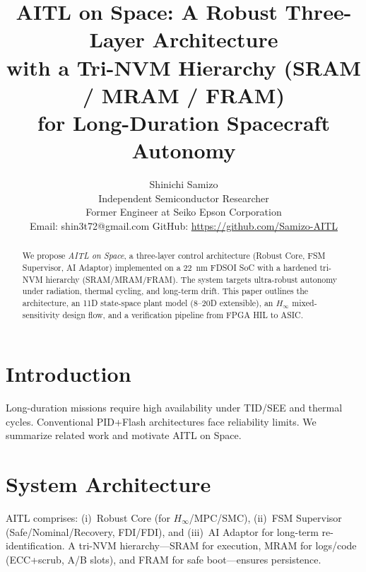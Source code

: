 \documentclass[conference]{IEEEtran}
\title{AITL on Space: A Robust Three-Layer Architecture\\
with a Tri-NVM Hierarchy (SRAM / MRAM / FRAM)\\
for Long-Duration Spacecraft Autonomy}
\author{%
Shinichi Samizo\\
Independent Semiconductor Researcher\\
Former Engineer at Seiko Epson Corporation\\
Email: shin3t72@gmail.com \quad GitHub: \url{https://github.com/Samizo-AITL}
}
\begin{document}
\maketitle

\begin{abstract}
We propose \emph{AITL on Space}, a three-layer control architecture (Robust Core, FSM Supervisor, AI Adaptor) implemented on a \SI{22}{nm} FDSOI SoC with a hardened tri-NVM hierarchy (SRAM/MRAM/FRAM). The system targets ultra-robust autonomy under radiation, thermal cycling, and long-term drift. This paper outlines the architecture, an 11D state-space plant model (8--20D extensible), an $H_\infty$ mixed-sensitivity design flow, and a verification pipeline from FPGA HIL to ASIC.
\end{abstract}

\section{Introduction}
Long-duration missions require high availability under TID/SEE and thermal cycles.
Conventional PID+Flash architectures face reliability limits.
We summarize related work and motivate AITL on Space.

\section{System Architecture}
AITL comprises: (i)~Robust Core (for $H_\infty$/MPC/SMC), (ii)~FSM Supervisor (Safe/Nominal/Recovery, FDI/FDI), and (iii)~AI Adaptor for long-term re-identification. A tri-NVM hierarchy---SRAM for execution, MRAM for logs/code (ECC+scrub, A/B slots), and FRAM for safe boot---ensures persistence.
\end{document}
